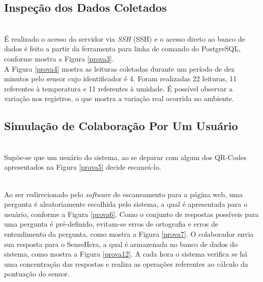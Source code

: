 \subsection{Inspeção dos Dados Coletados}
\label{subsec:dados}
\\\null \quad É realizado o acesso do servidor via \textit{\acrlong{SSH}} (\acrshort{SSH}) e o acesso direto ao banco de dados é feito a partir da ferramenta para linha de comando do PostgreSQL, conforme mostra a Figura \ref{prova3}.
\\\null \quad A Figura \ref{prova4} mostra as leituras coletadas durante um período de dez minutos pelo sensor cujo identificador é 4. Foram realizadas 22 leituras, 11 referentes à temperatura e 11 referentes à umidade. É possível observar a variação nos registros, o que mostra a variação real ocorrida no ambiente.

\subsection{Simulação de Colaboração Por Um Usuário}
\label{subsec:colaboracao}
\\\null \quad Supõe-se que um usuário do sistema, ao se deparar com algum dos QR-Codes apresentados na Figura \ref{prova5} decide escaneá-lo.
\pagebreak
{}

\\\null \quad Ao ser redirecionado pelo \textit{software} de escaneamento para a página web, uma pergunta é aleatoriamente escolhida pelo sistema, a qual é apresentada para o usuário, conforme a Figura \ref{prova6}. Como o conjunto de respostas possíveis para uma pergunta é pré-definido, evitam-se erros de ortografia e erros de entendimento da pergunta, como mostra a Figura \ref{prova7}. O colaborador envia sua resposta para o SenseHera, a qual é armazenada no banco de dados do sistema, como mostra a Figura \ref{prova12}. A cada hora o sistema verifica se há uma concentração das respostas e realiza as operações referentes ao cálculo da pontuação do sensor.
\pagebreak
{}

